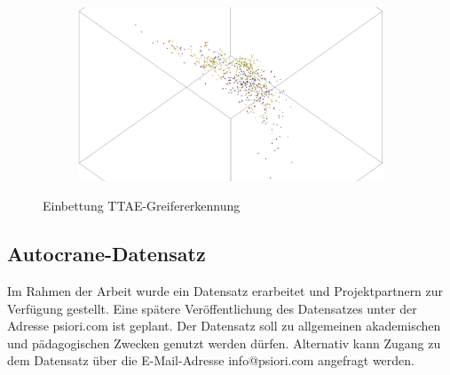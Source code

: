 \begin{figure}[h]
\begin{subfigure}[c]{0.6\textwidth}
 			\includegraphics[width=1\textwidth]{bilder/FazitUndAusblick/Grapple_TTAE_Res/TT_Emb_pred.png}
 			\label{img:TTGrappleEinbettungVorhersage}	
 		\end{subfigure}
 		\caption{Einbettung TTAE-Greifererkennung}
 		\label{img:TTGrappleEmb}
 	\end{figure}
 	
	\subsection{Autocrane-Datensatz}
	\label{subsec:AutocraneDatensatz}	
	Im Rahmen der Arbeit wurde ein Datensatz erarbeitet und Projektpartnern zur Verfügung gestellt. Eine spätere Veröffentlichung des Datensatzes unter der Adresse psiori.com ist geplant. Der Datensatz soll zu allgemeinen akademischen und pädagogischen Zwecken genutzt werden dürfen. Alternativ kann Zugang zu dem Datensatz über die E-Mail-Adresse info@psiori.com angefragt werden.

